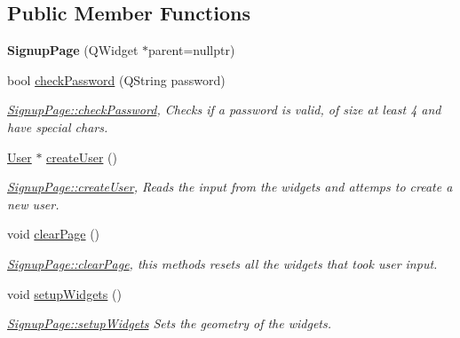 \subsection*{Public Member Functions}
\begin{DoxyCompactItemize}
\item 
\mbox{\label{classSignupPage_af41bce1fd7c7e7f6b78e7dd0e790f1c5}} 
{\bfseries Signup\+Page} (Q\+Widget $\ast$parent=nullptr)
\item 
bool \hyperlink{classSignupPage_afe8c63473a69b4763c1cbe9aaafbe895}{check\+Password} (Q\+String password)
\begin{DoxyCompactList}\small\item\em \hyperlink{classSignupPage_afe8c63473a69b4763c1cbe9aaafbe895}{Signup\+Page\+::check\+Password}, Checks if a password is valid, of size at least 4 and have special chars. \end{DoxyCompactList}\item 
\hyperlink{classUser}{User} $\ast$ \hyperlink{classSignupPage_ac6f433285ca77bcfa6bae1d3b37cd5b5}{create\+User} ()
\begin{DoxyCompactList}\small\item\em \hyperlink{classSignupPage_ac6f433285ca77bcfa6bae1d3b37cd5b5}{Signup\+Page\+::create\+User}, Reads the input from the widgets and attemps to create a new user. \end{DoxyCompactList}\item 
\mbox{\label{classSignupPage_ac686137b3a91a6d56fa016317108d74e}} 
void \hyperlink{classSignupPage_ac686137b3a91a6d56fa016317108d74e}{clear\+Page} ()
\begin{DoxyCompactList}\small\item\em \hyperlink{classSignupPage_ac686137b3a91a6d56fa016317108d74e}{Signup\+Page\+::clear\+Page}, this methods resets all the widgets that took user input. \end{DoxyCompactList}\item 
\mbox{\label{classSignupPage_afed84bf2953680930fbf70c1d16b3882}} 
void \hyperlink{classSignupPage_afed84bf2953680930fbf70c1d16b3882}{setup\+Widgets} ()
\begin{DoxyCompactList}\small\item\em \hyperlink{classSignupPage_afed84bf2953680930fbf70c1d16b3882}{Signup\+Page\+::setup\+Widgets} Sets the geometry of the widgets. \end{DoxyCompactList}\end{DoxyCompactItemize}
